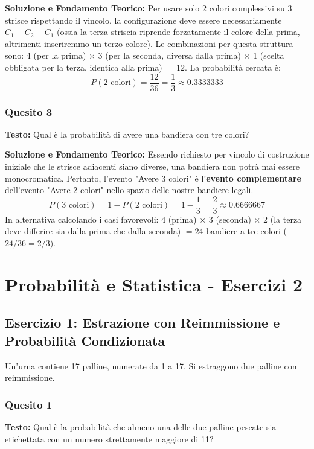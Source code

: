 \documentclass[12pt, a4paper]{article}
\begin{document}
\textbf{Soluzione e Fondamento Teorico:} 
Per usare solo 2 colori complessivi su 3 strisce rispettando il vincolo, la configurazione deve essere necessariamente $C_1 - C_2 - C_1$ (ossia la terza striscia riprende forzatamente il colore della prima, altrimenti inseriremmo un terzo colore).
Le combinazioni per questa struttura sono: 4 (per la prima) $\times$ 3 (per la seconda, diversa dalla prima) $\times$ 1 (scelta obbligata per la terza, identica alla prima) $= 12$.
La probabilità cercata è:
$$ P(2 \text{ colori}) = \frac{12}{36} = \frac{1}{3} \approx 0.3333333 $$

\subsubsection*{Quesito 3}
\textbf{Testo:} Qual è la probabilità di avere una bandiera con tre colori?

\textbf{Soluzione e Fondamento Teorico:} 
Essendo richiesto per vincolo di costruzione iniziale che le strisce adiacenti siano diverse, una bandiera non potrà mai essere monocromatica. Pertanto, l'evento "Avere 3 colori" è l'\textbf{evento complementare} dell'evento "Avere 2 colori" nello spazio delle nostre bandiere legali.
$$ P(3 \text{ colori}) = 1 - P(2 \text{ colori}) = 1 - \frac{1}{3} = \frac{2}{3} \approx 0.6666667 $$
In alternativa calcolando i casi favorevoli: 4 (prima) $\times$ 3 (seconda) $\times$ 2 (la terza deve differire sia dalla prima che dalla seconda) $= 24$ bandiere a tre colori ($24/36 = 2/3$).

\section*{Probabilità e Statistica - Esercizi 2}

\subsection*{Esercizio 1: Estrazione con Reimmissione e Probabilità Condizionata}
Un'urna contiene 17 palline, numerate da 1 a 17. Si estraggono due palline con reimmissione.

\subsubsection*{Quesito 1}
\textbf{Testo:} Qual è la probabilità che almeno una delle due palline pescate sia etichettata con un numero strettamente maggiore di 11?
\end{document}
